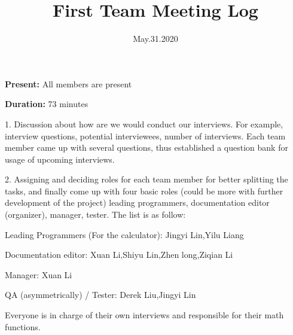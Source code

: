 \documentclass[12pt]{article}
\date{May.31.2020}
\title{First Team Meeting Log}
\begin{document}
\maketitle
\textbf{Present:} All members are present

\textbf{Duration:} 73 minutes

1.	Discussion about how are we would conduct our interviews. For example, interview questions, potential interviewees, number of interviews. Each team member came up with several questions, thus established a question bank for usage of upcoming interviews.

2.	Assigning and deciding roles for each team member for better splitting the tasks, and finally come up with four basic roles (could be more with further development of the project) leading programmers, documentation editor (organizer), manager, tester. The list is as follow:

Leading Programmers (For the calculator): 
Jingyi Lin,Yilu Liang

Documentation editor: 
Xuan Li,Shiyu Lin,Zhen long,Ziqian Li

Manager:  
Xuan Li

QA (asymmetrically) / Tester:
Derek Liu,Jingyi Lin

Everyone is in charge of their own interviews and responsible for their math functions.
\end{document}
